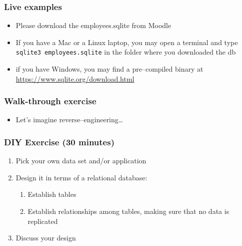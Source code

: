 \documentclass[\printmode,compress,xcolor=dvipsnames]{beamer}
\begin{document}
\begin{frame}
  \frametitle<+->{Live examples}

  \begin{itemize}

    \item Please download the employees.sqlite from Moodle

    \item If you have a Mac or a Linux laptop, you may open a terminal and
            type {\tt sqlite3 employees.sqlite} in the folder where you
            downloaded the db

    \item if you have Windows, you may find a pre--compiled binary at \url{https://www.sqlite.org/download.html}

  \end{itemize}

\end{frame}

\begin{frame}
  \frametitle<+->{Walk-through exercise}

  \begin{itemize}[<+- | alert@+->]

    \item Let's imagine reverse--engineering\dots {}

  \end{itemize}

\end{frame}

\begin{frame}
  \frametitle<+->{DIY Exercise (30 minutes)}

  \begin{enumerate}[<+- | alert@+->]

    \item Pick your own data set and/or application

    \item Design it in terms of a relational database:

     \begin{enumerate}[<+- | alert@+->]

       \item Establish tables

       \item Establish relationships among tables, making sure that no data is
             replicated

     \end{enumerate}

     \item Discuss your design

  \end{enumerate}

\end{frame}
\end{document}
